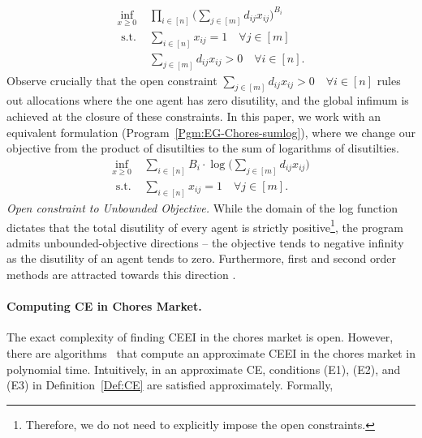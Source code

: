\documentclass[format=acmsmall,authorversion]{acmart}
\newcommand{\infd}{unbounded-objective direction}
\begin{document}
\begin{align}
    \inf_{x \geq 0} \; &\prod_{i \in [n]} \bigg(\sum_{j \in [m]} d_{ij}x_{ij} \bigg)^{B_i} \nonumber \\
    \text{ s.t. } & \sum_{i \in [n]} x_{ij} =1 \quad  \forall j \in [m]  \label{Pgm:EG-Chores-prod}\\
    &\sum_{j \in [m]} d_{ij}x_{ij} > 0 \quad \forall i \in [n] \nonumber.
\end{align}
Observe crucially that the open constraint $\sum_{j \in [m]} d_{ij}x_{ij} > 0 \quad \forall i \in [n]$ rules out allocations where the one agent has zero disutility, and the global infimum is achieved at the closure of these constraints. In this paper, we work with an equivalent formulation (Program~\ref{Pgm:EG-Chores-sumlog}), where we change our objective from the product of disutilties to the sum of logarithms of disutilties. 
\begin{align}
    \inf_{x \geq 0} \; &\sum_{i \in [n]} B_i \cdot \log\bigg(\sum_{j \in [m]} d_{ij}x_{ij} \bigg) \label{Pgm:EG-Chores-sumlog}\\
    \text{ s.t. } & \sum_{i \in [n]} x_{ij} =1 \quad  \forall j \in [m] \nonumber.
\end{align}
{\em Open constraint to Unbounded Objective.} While the domain of the log function dictates that the total disutility of every agent is strictly positive\footnote{Therefore, we do not need to explicitly impose the open constraints.}, the program admits \infd s -- the objective tends to negative infinity as the disutility of an agent tends to zero. Furthermore, first and second order methods are attracted towards this direction \cite{boodaghians2022polynomial}.

\paragraph{Computing CE in Chores Market.} The exact complexity of finding CEEI in the chores market is open. However, there are algorithms~\cite{boodaghians2022polynomial, ChaudhuryGMM22} that compute an approximate CEEI in the chores market in polynomial time. Intuitively, in an approximate CE, conditions (E1), (E2), and (E3) in Definition~\ref{Def:CE} are satisfied approximately. Formally,
\end{document}
